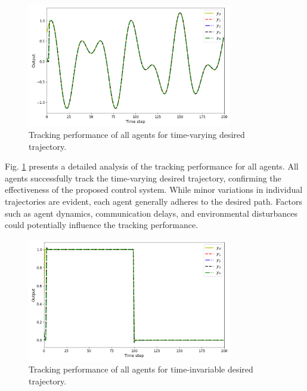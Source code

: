 \documentclass[journal,onecolumn]{IEEEtran}
\begin{document}
\begin{figure}[H]
    \centering
    \includegraphics[width=0.8\textwidth]{Figure_1.png}
    \caption{Tracking performance of all agents for time-varying desired trajectory.}
    \label{fig:figure_3} %
\end{figure}

Fig. \ref{fig:figure_3} presents a detailed analysis of the tracking performance for all agents. All agents successfully track the time-varying desired trajectory, confirming the effectiveness of the proposed control system. While minor variations in individual trajectories are evident, each agent generally adheres to the desired path. Factors such as agent dynamics, communication delays, and environmental disturbances could potentially influence the tracking performance.

\begin{figure}[H]
    \centering
    \includegraphics[width=0.8\textwidth]{Figure_4.png}
    \caption{Tracking performance of all agents for time-invariable desired trajectory.}
    \label{fig:figure_4} %
\end{figure}
\end{document}
